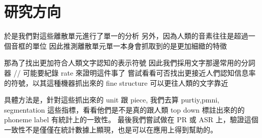
\section{研究方向}  %

於是我們對這些離散單元進行了單一的分析
另外，因為人類的音素往往是超過一個音框的單位
因此推測離散單元單一本身會抓取到的是更加細緻的特徵

那為了找出更加符合人類文字認知的表示符號
因此我們採用文字那邊常用的分詞器
// 可能要紀錄 rate 來證明這件事了
嘗試看看可否找出更接近人們認知信息率的符號，以其這種機器抓出來的 fine structure 可以更往人類的文字靠近

具體方法是，針對這些抓出來的 unit 跟 piece, 我們去算 purtiy,pmni, segmentation 這些指標，看看他們是不是真的跟人類 top down 標註出來的的 phoneme label 有統計上的一致性。
最後我們嘗試做在 PR 或 ASR 上，驗證這個一致性不是僅僅在統計數據上顯現，也是可以在應用上得到幫助的。